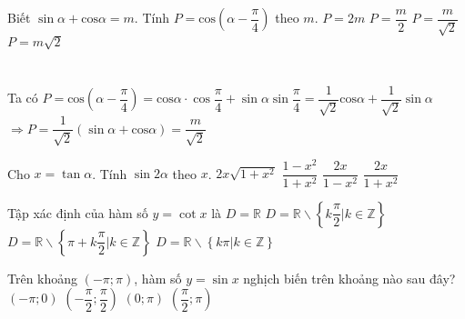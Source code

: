     \begin{ex}
    Biết $\sin \alpha +\text{cos}\alpha =m$. Tính $P=\text{cos}\left(\alpha -\dfrac{\pi }{4}\right)$ theo $m$.
    \choice
    {$P=2m$}
    {$P=\dfrac{m}{2}$}
    {\True $P=\dfrac{m}{\sqrt{2}}$}
    {$P=m\sqrt{2}$}
    \loigiai{}\\
    { }\\
    {\True\\
    Ta có $P=\text{cos}\left(\alpha -\dfrac{\pi }{4}\right)=\text{cos}\alpha \cdot \cos \dfrac{\pi }{4}+\sin \alpha \sin \dfrac{\pi }{4}=\dfrac{1}{\sqrt{2}}\text{cos}\alpha +\dfrac{1}{\sqrt{2}}\sin \alpha $\\
    $\Rightarrow P=\dfrac{1}{\sqrt{2}}\left(\sin \alpha +\text{cos}\alpha\right)=\dfrac{m}{\sqrt{2}}$
    }
    \end{ex}
    \begin{ex}
    Cho $x=\tan \alpha $. Tính $\sin 2\alpha $ theo $x$.
    \choice
    {$2x\sqrt{1+x^2}$}
    {$\dfrac{1-x^2}{1+x^2}$}
    {$\dfrac{2x}{1-x^2}$}
    {\True $\dfrac{2x}{1+x^2}$}
    \end{ex}
    \begin{ex}
    Tập xác định của hàm số $y=\cot x$ là
    \choice
    {$D=\mathbb{R}$}
    {$D=\mathbb{R}\backslash \left\{ k\dfrac{\pi }{2}\left| k\in \mathbb{Z} \right. \right\}$}
    {$D=\mathbb{R}\backslash \left\{ \pi +k\dfrac{\pi }{2}\left| k\in \mathbb{Z} \right. \right\}$}
    {\True $D=\mathbb{R}\backslash \left\{ k\pi \left| k\in \mathbb{Z} \right. \right\}$}
    \end{ex}
    \begin{ex}
    Trên khoảng $\left(-\pi ;\pi\right)$, hàm số $y=\sin x$ nghịch biến trên khoảng nào sau đây?
    \choice
    {$\left(-\pi ;0\right)$}
    {$\left(-\dfrac{\pi }{2};\dfrac{\pi }{2}\right)$}
    {$\left(0;\pi\right)$}
    {\True $\left(\dfrac{\pi }{2};\pi\right)$}
    \end{ex}
